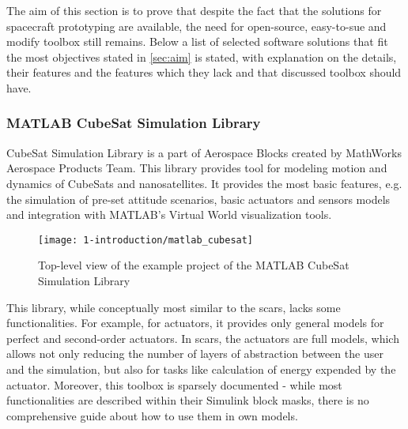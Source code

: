     The aim of this section is to prove that despite the fact that the solutions for spacecraft prototyping are available, the need for open-source, easy-to-sue and modify toolbox still remains. Below a list of selected software solutions that fit the most objectives stated in \autoref{sec:aim} is stated, with explanation on the details, their features and the features which they lack and that discussed toolbox should have.
    \vfill
    \subsubsection{MATLAB CubeSat Simulation Library}
        CubeSat Simulation Library is a part of Aerospace Blocks created by MathWorks Aerospace Products Team. This library provides tool for modeling motion and dynamics of CubeSats and nanosatellites. It provides the most basic features, e.g. the simulation of pre-set attitude scenarios, basic actuators and sensors models and integration with MATLAB's Virtual World visualization tools.\\[0.1cm]
        \vfill
        
        \begin{figure}[H]
            \centering
            \texttt{[image: 1-introduction/matlab\_cubesat]}\\[0.1cm]
            \caption{Top-level view of the example project of the MATLAB CubeSat Simulation Library}
            \label{fig:matlab_cubesat}
        \end{figure}

        \vfill

        This library, while conceptually most similar to the \ac{scars}, lacks some functionalities. For example, for actuators, it provides only general models for perfect and second-order actuators. In \ac{scars}, the actuators are full models, which allows not only reducing the number of layers of abstraction between the user and the simulation, but also for tasks like calculation of energy expended by the actuator. Moreover, this toolbox is sparsely documented - while most functionalities are described within their Simulink block masks, there is no comprehensive guide about how to use them in own models\cite{matlabcubesat}.
        \vfill

